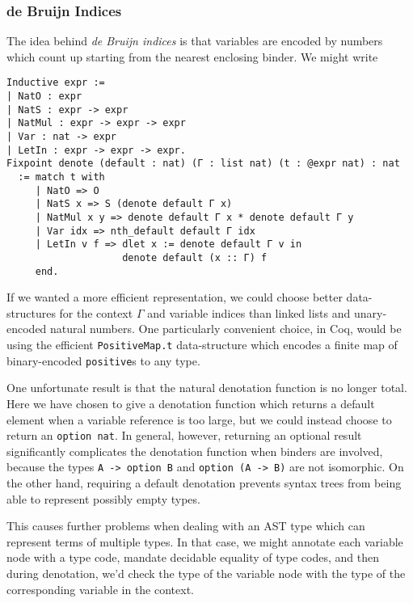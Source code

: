 \subsubsection{de Bruijn Indices} \label{sec:binders:de-bruijn}
The idea behind \emph{de Bruijn indices} is that variables are encoded by numbers which count up starting from the nearest enclosing binder.
We might write
\begin{verbatim}
Inductive expr :=
| NatO : expr
| NatS : expr -> expr
| NatMul : expr -> expr -> expr
| Var : nat -> expr
| LetIn : expr -> expr -> expr.
Fixpoint denote (default : nat) (Γ : list nat) (t : @expr nat) : nat
  := match t with
     | NatO => O
     | NatS x => S (denote default Γ x)
     | NatMul x y => denote default Γ x * denote default Γ y
     | Var idx => nth_default default Γ idx
     | LetIn v f => dlet x := denote default Γ v in
                    denote default (x :: Γ) f
     end.
\end{verbatim}
If we wanted a more efficient representation, we could choose better data-structures for the context $\Gamma$ and variable indices than linked lists and unary-encoded natural numbers.
One particularly convenient choice, in Coq, would be using the efficient \texttt{PositiveMap.t} data-structure which encodes a finite map of binary-encoded \texttt{positive}s to any type.

One unfortunate result is that the natural denotation function is no longer total.
Here we have chosen to give a denotation function which returns a default element when a variable reference is too large, but we could instead choose to return an \texttt{option nat}.
In general, however, returning an optional result significantly complicates the denotation function when binders are involved, because the types \texttt{A -> option B} and \texttt{option (A -> B)} are not isomorphic.
On the other hand, requiring a default denotation prevents syntax trees from being able to represent possibly empty types.

This causes further problems when dealing with an AST type which can represent terms of multiple types.
In that case, we might annotate each variable node with a type code, mandate decidable equality of type codes, and then during denotation, we'd check the type of the variable node with the type of the corresponding variable in the context.

